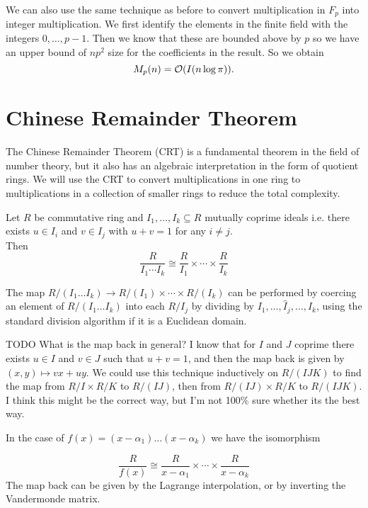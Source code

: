 We can also use the same technique as before to convert multiplication in $F_p$ into integer multiplication. We first identify the elements in the finite field with the integers $0,\ldots, p-1$. Then we know that these are bounded above by $p$ so we have an upper bound of $np^2$ size for the coefficients in the result. So we obtain
\[
    M_p(n) = \mathcal O(I(n \log \pi)).
\]

\section{Chinese Remainder Theorem}%
\label{sec:crt}

The Chinese Remainder Theorem (CRT) is a fundamental theorem in the field of number theory, but it also has an algebraic interpretation in the form of quotient rings. We will use the CRT to convert multiplications in one ring to multiplications in a collection of smaller rings to reduce the total complexity.

\begin{theorem}
    Let $R$ be commutative ring and $I_1, \ldots, I_k \subseteq R$ mutually coprime ideals i.e. there exists $u \in I_i$ and $v \in I_j$ with $u + v = 1$ for any $i \neq j$.\\
    Then
    \[
        \frac{R}{I_1\cdots I_k} \cong \frac{R}{I_1} \times \cdots \times \frac{R}{I_k}
    \]
\end{theorem}

The map $R/(I_1\ldots I_k) \to R/(I_1) \times \cdots \times R/(I_k)$ can be performed by coercing an element of $R/(I_1 \ldots I_k)$ into each $R / I_j$ by dividing by $I_1, \ldots, \hat{I}_j, \ldots, I_k$, using the standard division algorithm if it is a Euclidean domain. 

TODO What is the map back in general? I know that for $I$ and $J$ coprime there exists $u \in I$ and $v \in J$ such that $u + v = 1$, and then the map back is given by $(x, y) \mapsto vx + uy$. We could use this technique inductively on $R/(IJK)$ to find the map from $R / I \times R / K$ to $R / (IJ)$, then from $R / (IJ) \times R / K$ to $R / (IJK)$. I think this might be the correct way, but I'm not 100\% sure whether its the best way.

In the case of $f(x) = (x - \alpha_1) \ldots (x - \alpha_k)$ we have the isomorphism

\[
    \frac{R}{f(x)} \cong \frac{R}{x - \alpha_1} \times \cdots \times \frac{R}{x - \alpha_k}
\]
The map back can be given by the Lagrange interpolation, or by inverting the Vandermonde matrix. 
